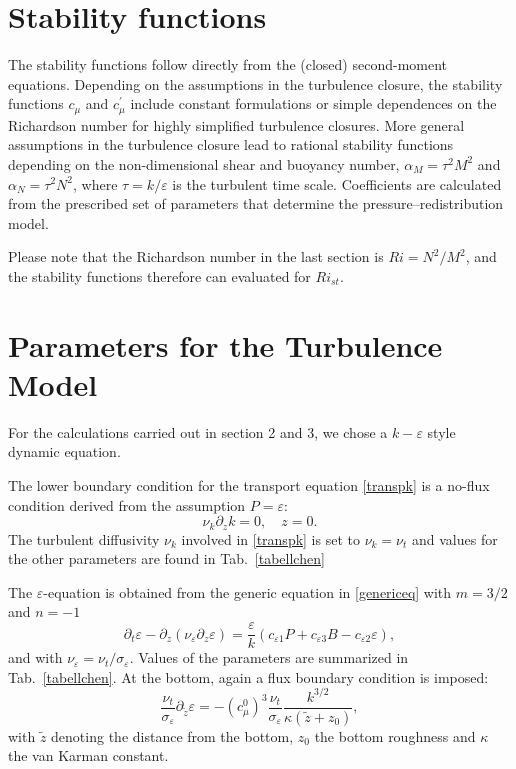 \section{Stability functions}

The stability functions follow directly from the (closed) second-moment 
equations. Depending on the assumptions in the turbulence closure, the 
stability functions $c_\mu$ and $c_\mu^\prime$ include 
constant formulations or simple dependences on the Richardson number for 
highly simplified turbulence closures. More
general assumptions in the turbulence closure lead to rational stability 
functions depending on the non-dimensional shear and buoyancy number, $\alpha_M 
= \tau^2 M^2$ and $\alpha_N = \tau^2 N^2$, where $\tau = k \slash \varepsilon $ 
is the turbulent 
time scale. Coefficients are calculated from the prescribed set of parameters 
that determine the pressure--redistribution model.


Please note that the Richardson number in the last section is $Ri = N^2 \slash 
M^2$, and the stability functions therefore can evaluated for $Ri_{st}$.

\section{Parameters for the Turbulence Model}

For the calculations carried out in section 2 and 3, we chose a $k-\varepsilon$ 
style dynamic equation.

The lower boundary condition for 
the transport equation \eqref{transpk} is a no-flux condition derived from the 
assumption $P=\varepsilon$:
\begin{equation}
 \label{lowerBC}
 \nu_k \partial_z k = 0, \quad z=0.
\end{equation}
The turbulent diffusivity $\nu_k$ involved in \eqref{transpk} is set to $\nu_k 
= \nu_t$ and values for the other parameters are found in Tab.\ \ref{tabellchen}

The $\varepsilon$-equation is obtained from the generic equation in 
\eqref{genericeq} with $m=3\slash 2$ and $n=-1$ 
\begin{equation}
 \label{transpeps}
 \partial_t \varepsilon - \partial_z ( \nu_\varepsilon \partial_z \varepsilon) 
= \frac{\varepsilon}{k} (c_{\varepsilon 1}P + c_{\varepsilon 3} B 
-c_{\varepsilon 2} \varepsilon),
\end{equation}
and with $\nu_\varepsilon = \nu_t \slash \sigma_\varepsilon$. Values of the 
parameters are summarized in Tab.\ \ref{tabellchen}. At the bottom, again a 
flux boundary condition is imposed:
\begin{equation}
 \label{epsBC}
 \frac{\nu_t}{\sigma_\varepsilon} \partial_{\tilde{z}} \varepsilon = - 
(c_\mu^0)^3  \frac{\nu_t}{\sigma_\varepsilon} \frac{k^{3 \slash 2}}{\kappa 
(\tilde{z} +z_0)},
\end{equation}
with $\tilde{z}$ denoting the distance from the bottom, $z_0$ the bottom 
roughness and $\kappa$ the van Karman constant.

